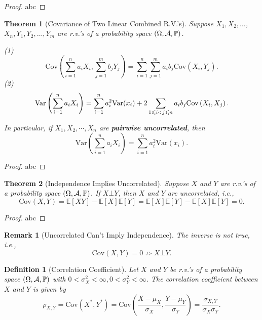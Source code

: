 \documentclass[openany,12pt]{book}
\newtheorem{theorem}{Theorem}[chapter]
\newtheorem{remark}{Remark}[chapter]
\newtheorem{definition}{Definition}[chapter]
\begin{document}
\begin{proof}
  abc
\end{proof}

\begin{theorem}[Covariance of Two Linear Combined R.V.'s]
  Suppose $X_{1}, X_{2}, \dots$, $X_{n}, Y_{1}, Y_{2}, \dots,Y_{m}$ are r.v.'s of a probability space $(\Omega,\mathcal{A},\mathbb{P})$.

  (1)
  \[\mathrm{Cov}\left( \sum_{i = 1}^{n}{a_{i}X_{i}}, \sum_{j = 1}^{m}{b_{j}Y_{j}} \right)= \sum_{i = 1}^{n}{\sum_{j = 1}^{m}a_{i}b_{j}}\mathrm{Cov}\left( X_{i},Y_{j} \right).\]
  (2)
  \[\mathrm{Var}\left( \sum_{i = 1}^{n}{a_{i}X_{i}} \right)= \sum_{i = 1}^{n}{a_{i}^{2}\mathrm{Var}(x_{i})} + 2\sum_{1 \leqslant i < j \leqslant n}^{}a_{i}b_{j}\mathrm{Cov}\left( X_{i},X_{j} \right).\]

  In particular, if $X_{1}, X_{2}, \cdots,X_{n}$ are \textbf{pairwise
    uncorrelated}, then
  \[\mathrm{Var}\left( \sum_{i = 1}^{n}{a_{i}X_{i}} \right)= \sum_{i = 1}^{n}{a_{i}^{2}\mathrm{Var}(x_{i})}.\]
\end{theorem}

\begin{proof}
  abc
\end{proof}

\begin{theorem}[Independence Implies Uncorrelated]
  Suppose $X$ and $Y$ are r.v.'s of a probability space $(\Omega,\mathcal{A},\mathbb{P})$. If $X\bot Y$, then $X$ and $Y$ are uncorrelated, i.e.,
  \[\mathrm{Cov}(X,Y)= \mathbb{E}[XY] - \mathbb{E}[X] \mathbb{E}[Y] = \mathbb{E}[X] \mathbb{E}[Y] - \mathbb{E}[X] \mathbb{E}[Y] = 0.\]
\end{theorem}

\begin{proof}
  abc
\end{proof}

\begin{remark}[Uncorrelated Can't Imply Independence]
  The inverse is not true, i.e.,
  \[\mathrm{Cov}(X,Y)= 0 \nRightarrow X\bot Y.\]
\end{remark}

\begin{definition}[Correlation Coefficient]
  Let $X$ and $Y$ be r.v.'s of a probability space $(\Omega,\mathcal{A},\mathbb{P})$ with
  $0 < \sigma_{X}^{2} < \infty,0 < \sigma_{Y}^{2} < \infty$. The correlation coefficient between $X$ and $Y$ is given by
  \[\rho_{X,Y} = \mathrm{Cov}\left( X^{*},Y^{*} \right)= \mathrm{Cov}\left( \frac{X - \mu_{X}}{\sigma_{X}},\frac{Y - \mu_{Y}}{\sigma_{Y}} \right)= \frac{\sigma_{X,Y}}{\sigma_{X}\sigma_{Y}}.\]
\end{definition}
\end{document}
